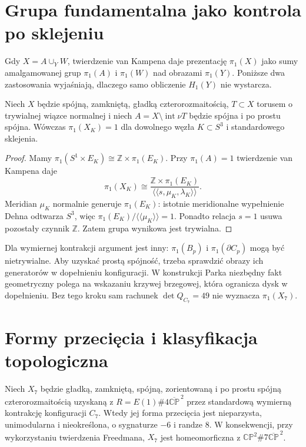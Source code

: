 \section{Grupa fundamentalna jako kontrola po sklejeniu}
\label{sec:tg-syn-pi1}

Gdy $X=A\cup_Y W$, twierdzenie van Kampena daje prezentację
$\pi_1(X)$ jako sumy amalgamowanej grup $\pi_1(A)$ i
$\pi_1(W)$ nad obrazami $\pi_1(Y)$. Poniższe dwa zastosowania
wyjaśniają, dlaczego samo obliczenie $H_1(Y)$ nie wystarcza.

\begin{stwierdzenie}
\label{prop:tg-syn-pi1}
Niech $X$ będzie spójną, zamkniętą, gładką czterorozmaitością,
$T\subset X$ torusem o trywialnej wiązce normalnej i niech
$A=X\setminus\operatorname{int}\nu T$ będzie spójna i po prostu
spójna. Wówczas $\pi_1(X_K)=1$ dla dowolnego węzła
$K\subset S^3$ i standardowego sklejenia.
\end{stwierdzenie}

\begin{proof}
Mamy $\pi_1(S^1\times E_K)\cong\mathbb Z\times\pi_1(E_K)$.
Przy $\pi_1(A)=1$ twierdzenie van Kampena daje
\[
 \pi_1(X_K)\cong
 \frac{\mathbb Z\times\pi_1(E_K)}
 {\langle\!\langle s,\mu_K,\lambda_K\rangle\!\rangle}.
\]
Meridian $\mu_K$ normalnie generuje $\pi_1(E_K)$: istotnie
meridionalne wypełnienie Dehna odtwarza $S^3$, więc
$\pi_1(E_K)/\langle\!\langle\mu_K\rangle\!\rangle=1$.
Ponadto relacja $s=1$ usuwa pozostały czynnik $\mathbb Z$.
Zatem grupa wynikowa jest trywialna.
\end{proof}

Dla wymiernej kontrakcji argument jest inny:
$\pi_1(B_p)$ i $\pi_1(\partial C_p)$ mogą być nietrywialne.
Aby uzyskać prostą spójność, trzeba sprawdzić obrazy ich
generatorów w dopełnieniu konfiguracji. W konstrukcji Parka
niezbędny fakt geometryczny polega na wskazaniu krzywej
brzegowej, która ogranicza dysk w dopełnieniu. Bez tego
kroku sam rachunek $\det Q_{C_7}=49$ nie wyznacza
$\pi_1(X_7)$.

\section{Formy przecięcia i klasyfikacja topologiczna}
\label{sec:tg-syn-freedman}

\begin{twierdzenie}
\label{thm:tg-syn-park-homeo}
Niech $X_7$ będzie gładką, zamkniętą, spójną,
zorientowaną i po prostu spójną czterorozmaitością
uzyskaną z $R=E(1)\#4\overline{\mathbb{CP}}^{\,2}$
przez standardową wymierną kontrakcję konfiguracji $C_7$.
Wtedy jej forma przecięcia jest nieparzysta, unimodularna
i nieokreślona, o sygnaturze $-6$ i randze $8$.
W konsekwencji, przy wykorzystaniu twierdzenia Freedmana,
$X_7$ jest homeomorficzna z
$\mathbb{CP}^2\#7\overline{\mathbb{CP}}^{\,2}$.
\end{twierdzenie}

